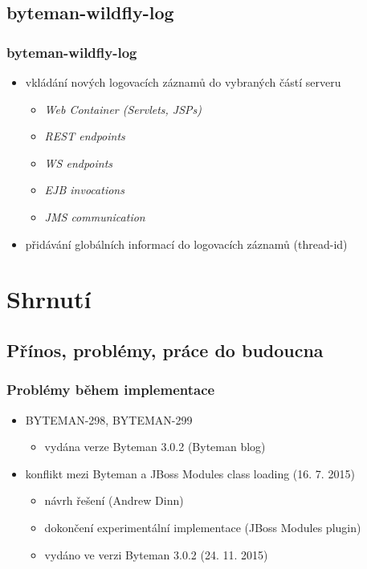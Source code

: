 \documentclass{beamer}
\begin{document}
\subsection{byteman-wildfly-log}
\begin{frame}[fragile] %
\frametitle{byteman-wildfly-log}
\begin{itemize}
	\item vkládání nových logovacích záznamů do vybraných částí serveru
	\begin{itemize}
		\item \textit{Web Container (Servlets, JSPs)}
		\item \textit{REST endpoints}
		\item \textit{WS endpoints}
		\item \textit{EJB invocations}
		\item \textit{JMS communication}
	\end{itemize}
	\item přidávání globálních informací do logovacích záznamů (thread-id)
\end{itemize}
\end{frame}


\section{Shrnutí}
\subsection{Přínos, problémy, práce do budoucna}
\begin{frame}
	\frametitle{Problémy během implementace}
	\begin{itemize}
		\item BYTEMAN-298, BYTEMAN-299
		\begin{itemize}
			\item vydána verze Byteman 3.0.2 (Byteman blog)
		\end{itemize}
		\item konflikt mezi Byteman a JBoss Modules class loading (16. 7. 2015)
		\begin{itemize}
			\item návrh řešení (Andrew Dinn)
			\item dokončení experimentální implementace (JBoss Modules plugin)
			\item vydáno ve verzi Byteman 3.0.2 (24. 11. 2015)
		\end{itemize}
	\end{itemize}
\end{frame}
\end{document}
